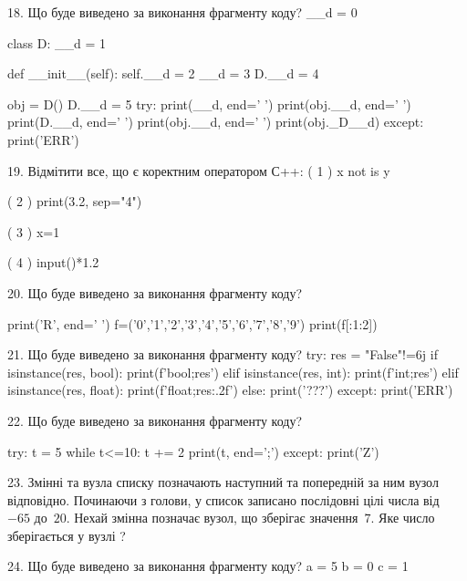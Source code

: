 \documentclass[11pt]{article}
\begin{document}
18. Що буде виведено за виконання фрагменту коду?
__d = 0

class D:
    __d = 1
    
    def __init__(self):
        self.__d = 2
        __d = 3
        D.__d = 4

obj = D()
D.__d = 5
try:
    print(__d, end=' ')
    print(obj.__d, end=' ')
    print(D.__d, end=' ')
    print(obj.__d, end=' ')
    print(obj._D__d)
except:
    print('ERR')
\vspace{5mm}

19. %
Відмітити все, що є коректним оператором С++:
( 1 ) x not is y

( 2 ) print(3.2, sep="4")

( 3 ) x=1%

( 4 ) input()*1.2
\vspace{5mm}

20. Що буде виведено за виконання фрагменту коду?

print('R', end=' ')
f=('0','1','2','3','4','5','6','7','8','9')
print(f[:1:2])

\vspace{5mm}

21. Що буде виведено за виконання фрагменту коду?
try:
    res = "False"!=6j
    if isinstance(res, bool):
        print(f'bool;{res}')
    elif isinstance(res, int):
        print(f'int;{res}')
    elif isinstance(res, float):
        print(f'float;{res:.2f}')
    else:
        print('???')
except:
    print('ERR')
\vspace{5mm}

22. Що буде виведено за виконання фрагменту коду?

try:
    t = 5
    while t<=10:
        t += 2
    print(t, end=';')
except:
    print('Z')

\vspace{5mm}

23. 
Змінні  та  вузла списку позначають наступний та попередній за ним вузол відповідно. Починаючи з голови, у список записано послідовні цілі числа від~$-65$ до~$20$. Нехай змінна  позначає вузол, що зберігає значення~$7$.
Яке число зберігається у вузлі  ?
\vspace{5mm}

24. Що буде виведено за виконання фрагменту коду?
a = 5
b = 0
c = 1
\end{document}

